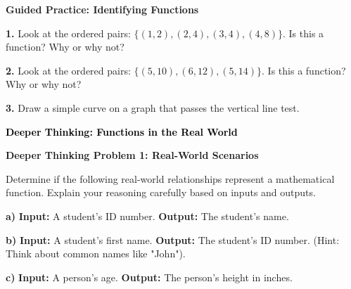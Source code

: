 \documentclass[12pt, letterpaper, fleqn]{article}
\begin{document}
\begin{tcolorbox}[colback=white!15, colframe=black, boxrule=1.5pt, arc=4mm, left=6mm, right=6mm, top=5mm, bottom=5mm]

\textbf{Guided Practice: Identifying Functions}

\medskip

\noindent
\textbf{1.} Look at the ordered pairs: $\{(1, 2), (2, 4), (3, 4), (4, 8)\}$. Is this a function? Why or why not?
\vspace{1.5cm}

\noindent
\textbf{2.} Look at the ordered pairs: $\{(5, 10), (6, 12), (5, 14)\}$. Is this a function? Why or why not?
\vspace{1.5cm}

\noindent
\textbf{3.} Draw a simple curve on a graph that passes the vertical line test.
\vspace{2.5cm}

\end{tcolorbox}

\newpage

\begin{tcolorbox}[colback=customteal!20]
\large\textcolor{black}{\textbf{Deeper Thinking: Functions in the Real World}}
\end{tcolorbox}

\vspace{3mm}

\begin{tcolorbox}[colback=white!15, colframe=black, boxrule=1.5pt, arc=4mm, left=6mm, right=6mm, top=5mm, bottom=5mm]

\textbf{Deeper Thinking Problem 1: Real-World Scenarios}

\medskip

\noindent
Determine if the following real-world relationships represent a mathematical function. Explain your reasoning carefully based on inputs and outputs.

\vspace{5mm}

\noindent
\textbf{a)} \textbf{Input:} A student's ID number. \textbf{Output:} The student's name.

\vspace{2.5cm}

\noindent
\textbf{b)} \textbf{Input:} A student's first name. \textbf{Output:} The student's ID number. (Hint: Think about common names like "John").

\vspace{2.5cm}

\noindent
\textbf{c)} \textbf{Input:} A person's age. \textbf{Output:} The person's height in inches.

\vspace{2.5cm}

\end{tcolorbox}
\end{document}
